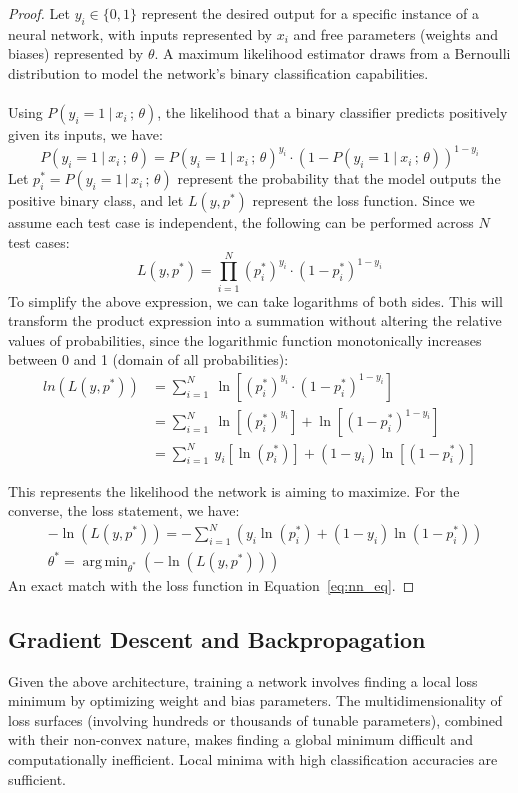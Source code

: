 \documentclass{article}
\DeclareMathOperator*{\argmin}{arg\,min}
\theoremstyle{definition}
\begin{document}
\begin{proof}
Let $y_i \in \{0,1\}$ represent the desired output for a specific instance of a neural network, with inputs represented by $x_i$ and free parameters (weights and biases) represented by $\theta$. A maximum likelihood estimator draws from a Bernoulli distribution to model the network's binary classification capabilities.\\ \\ Using $P(y_i = 1\:|\: x_i\,;\,\theta)$, the likelihood that a binary classifier predicts positively given its inputs, we have:
\[
P(y_i = 1\:|\: x_i\,;\,\theta) = P(y_i = 1\:|\:x_i \, ; \, \theta)^{y_i} \cdot (1-P(y_i = 1\:|\:x_i \, ; \, \theta))^{1-y_i}
\]
Let $p^*_i = P(y_i = 1 \, | \, x_i \, ; \, \theta)$ represent the probability that the model outputs the positive binary class, and let $L(y, p^*)$ represent the loss function. Since we assume each test case is independent, the following can be performed across $N$ test cases:
\[
L(y, p^*) = \prod^N_{i=1}(p^*_i)^{y_i} \cdot (1-p^*_i)^{1-y_i}
\]
To simplify the above expression, we can take logarithms of both sides. This will transform the product expression into a summation without altering the relative values of probabilities, since the logarithmic function monotonically increases between 0 and 1 (domain of all probabilities):
\begin{equation*}
\begin{aligned}
ln(L(y, p^*)) &= \sum_{i=1}^N \: \ln[(p^*_i)^{y_i} \cdot (1-p^*_i)^{1-y_i}] \\
&= \sum_{i=1}^N \: \ln[(p^*_i)^{y_i}] + \ln[(1-p^*_i)^{1-y_i}]\\
&= \sum_{i=1}^N \: y_i[\ln(p^*_i)] + (1-y_i)\ln[(1-p^*_i)]
\end{aligned}
\end{equation*}

This represents the likelihood the network is aiming to maximize. For the converse, the loss statement, we have:
\begin{equation*}
\begin{aligned}
&-\ln(L(y, p^*)) = - \sum_{i=1}^N (y_i\ln(p^*_i) + (1-y_i)\ln(1-p^*_i)) \\
&\theta^* = \argmin_{\theta^*}(-\ln(L(y, p^*)))
\end{aligned}
\end{equation*}
An exact match with the loss function in Equation~\eqref{eq:nn_eq}. 
\end{proof}
\subsection{Gradient Descent and Backpropagation}
\label{sec:grad_desc}
Given the above architecture, training a network involves finding a local loss minimum by optimizing weight and bias parameters. The multidimensionality of loss surfaces (involving hundreds or thousands of tunable parameters), combined with their non-convex nature, makes finding a global minimum difficult and computationally inefficient. Local minima with high classification accuracies are sufficient.
\end{document}
